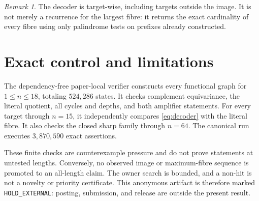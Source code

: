 \documentclass[10pt,a4paper]{amsart}
\theoremstyle{definition}
\theoremstyle{remark}
\newtheorem{remark}[theorem]{Remark}
\begin{document}
\begin{remark}
The decoder is target-wise, including targets outside the image.  It is not
merely a recurrence for the largest fibre: it returns the exact cardinality of
every fibre using only palindrome tests on prefixes already constructed.
\end{remark}

\section{Exact control and limitations}

The dependency-free paper-local verifier constructs every functional graph
for $1\le n\le18$, totaling $524{,}286$ states.  It checks complement
equivariance, the literal quotient, all cycles and depths, and both amplifier
statements.  For every target through $n=15$, it independently compares
\eqref{eq:decoder} with the literal fibre.  It also checks the closed sharp
family through $n=64$.  The canonical run executes $3{,}870{,}590$ exact
assertions.

These finite checks are counterexample pressure and do not prove statements
at untested lengths.  Conversely, no observed image or maximum-fibre sequence
is promoted to an all-length claim.  The owner search is bounded, and a
non-hit is not a novelty or priority certificate.  This anonymous artifact is
therefore marked \texttt{HOLD\_EXTERNAL}: posting, submission, and release are
outside the present result.



\end{document}
